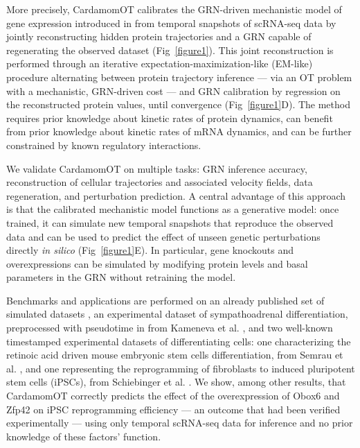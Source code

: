 \documentclass[a4paper, 11pt]{article}
\theoremstyle{plain}
\theoremstyle{remark}
\begin{document}
More precisely, CardamomOT calibrates the GRN-driven mechanistic model of gene expression introduced in \cite{herbachinferring2017, ventre2023one} from temporal snapshots of scRNA-seq data by jointly reconstructing hidden protein trajectories and a GRN capable of regenerating the observed dataset (Fig~\ref{figure1}). This joint reconstruction is performed through an iterative expectation-maximization-like (EM-like) procedure alternating between protein trajectory inference — via an OT problem with a mechanistic, GRN-driven cost — and GRN calibration by regression on the reconstructed protein values, until convergence (Fig~\ref{figure1}D). The method requires prior knowledge about kinetic rates of protein dynamics, can benefit from prior knowledge about kinetic rates of mRNA dynamics, and can be further constrained by known regulatory interactions.

We validate CardamomOT on multiple tasks: GRN inference accuracy, reconstruction of cellular trajectories and associated velocity fields, data regeneration, and perturbation prediction. A central advantage of this approach is that the calibrated mechanistic model functions as a generative model: once trained, it can simulate new temporal snapshots that reproduce the observed data and can be used to predict the effect of unseen genetic perturbations directly \textit{in silico} (Fig~\ref{figure1}E). In particular, gene knockouts and overexpressions can be simulated by modifying protein levels and basal parameters in the GRN without retraining the model. 

Benchmarks and applications are performed on an already published set of simulated datasets \cite{ventre2023one}, an experimental dataset of sympathoadrenal differentiation, preprocessed with pseudotime in \cite{gandrillon2025inferring} from Kameneva et al. \cite{kameneva2021single}, and two well-known timestamped experimental datasets of differentiating cells: one characterizing the retinoic acid driven mouse embryonic stem cells differentiation, from Semrau et al. \cite{Semrau_2017}, and one representing the reprogramming of fibroblasts to induced pluripotent stem cells (iPSCs), from Schiebinger et al. \cite{schiebinger2019optimal}.
We show, among other results, that CardamomOT correctly predicts the effect of the overexpression of {Obox6} and {Zfp42} on iPSC reprogramming efficiency \cite{schiebinger2019optimal} — an outcome that had been verified experimentally — using only temporal scRNA-seq data for inference and no prior knowledge of these factors' function.
\end{document}

